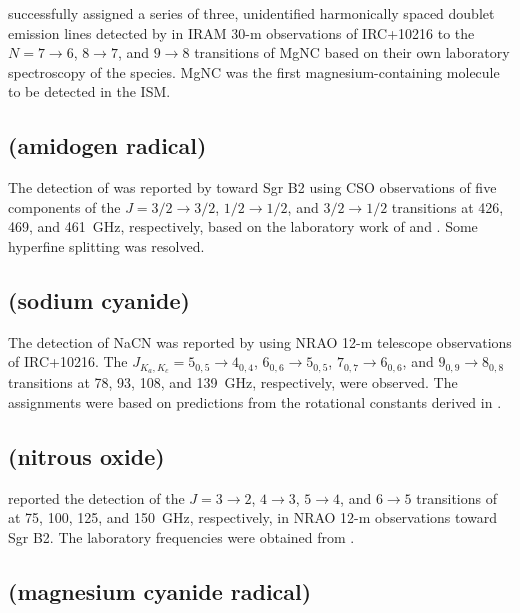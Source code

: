 \documentclass[twocolumn]{aastex631}
\begin{document}
	\citet{Kawaguchi:1993ft} successfully assigned a series of three, unidentified harmonically spaced doublet emission lines detected by \citet{Guelin:1986mq} in IRAM 30-m observations of IRC+10216 to the $N = 7\rightarrow6$, $8\rightarrow7$, and $9\rightarrow8$ transitions of MgNC based on their own laboratory spectroscopy of the species.  MgNC was the first magnesium-containing molecule to be detected in the ISM.
	
	\subsection{ (amidogen radical)}
	\label{NH2}
	
	The detection of  was reported by \citet{vanDishoeck:1993ds} toward Sgr B2 using CSO observations of five components of the $J = 3/2\rightarrow3/2$, $1/2\rightarrow1/2$, and $3/2\rightarrow1/2$ transitions at 426, 469, and 461~GHz, respectively, based on the laboratory work of \citet{Burkholder:1988gm} and \citet{Charo:1981wh}.  Some hyperfine splitting was resolved.
	
	\subsection{ (sodium cyanide)}
	\label{NaCN}
	
    The detection of NaCN was reported by \citet{Turner:1994es} using NRAO 12-m telescope observations of IRC+10216.  The $J_{K_a,K_c} = 5_{0,5}\rightarrow4_{0,4}$, $6_{0,6}\rightarrow5_{0,5}$, $7_{0,7}\rightarrow6_{0,6}$, and $9_{0,9}\rightarrow8_{0,8}$ transitions at 78, 93, 108, and 139~GHz, respectively, were observed.  The assignments were based on predictions from the rotational constants derived in \citet{vanVaals:1984gt}.
    
    \subsection{ (nitrous oxide)}
	\label{N2O}
	
	\citet{Ziurys:1994hd} reported the detection of the $J = 3\rightarrow2$, $4\rightarrow3$, $5\rightarrow4$, and $6\rightarrow5$ transitions of  at 75, 100, 125, and 150~GHz, respectively, in NRAO 12-m observations toward Sgr B2.  The laboratory frequencies were obtained from \citet{Lovas:1978hr}.
	
	\subsection{ (magnesium cyanide radical)}
	\label{MgCN}
	
\end{document}
